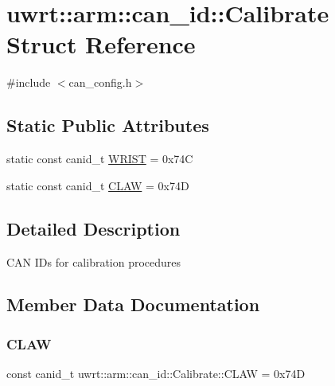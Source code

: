 \hypertarget{structuwrt_1_1arm_1_1can__id_1_1_calibrate}{}\section{uwrt\+:\+:arm\+:\+:can\+\_\+id\+:\+:Calibrate Struct Reference}
\label{structuwrt_1_1arm_1_1can__id_1_1_calibrate}


{\ttfamily \#include $<$can\+\_\+config.\+h$>$}

\subsection*{Static Public Attributes}
\begin{DoxyCompactItemize}
\item 
static const canid\+\_\+t \hyperlink{structuwrt_1_1arm_1_1can__id_1_1_calibrate_a61674e5392384ebd496a6bdff1b3e383}{W\+R\+I\+ST} = 0x74C
\item 
static const canid\+\_\+t \hyperlink{structuwrt_1_1arm_1_1can__id_1_1_calibrate_a24b0f9e55fcf76450ee9f28e51e6719e}{C\+L\+AW} = 0x74D
\end{DoxyCompactItemize}


\subsection{Detailed Description}
C\+AN I\+Ds for calibration procedures 

\subsection{Member Data Documentation}
\mbox{\label{structuwrt_1_1arm_1_1can__id_1_1_calibrate_a24b0f9e55fcf76450ee9f28e51e6719e}} 
\subsubsection{\texorpdfstring{C\+L\+AW}{CLAW}}
{\footnotesize\ttfamily const canid\+\_\+t uwrt\+::arm\+::can\+\_\+id\+::\+Calibrate\+::\+C\+L\+AW = 0x74D\hspace{0.3cm}{\ttfamily [static]}}

